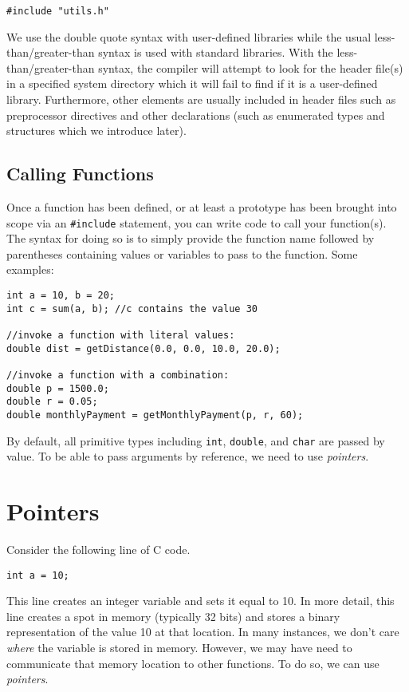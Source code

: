 \texttt{#include "utils.h"}

We use the double quote syntax with user-defined libraries while the
usual less-than/greater-than syntax is used with standard libraries.
With the less-than/greater-than syntax, the compiler will  
attempt to look for the header file(s) in a specified system directory
which it will fail to find if it is a user-defined library.
Furthermore, other elements are usually included in header files
such as preprocessor directives and other declarations (such as
enumerated types and structures which we introduce later).

\subsection{Calling Functions}

Once a function has been defined, or at least a prototype has
been brought into scope via an \texttt{#include} statement, 
you can write code to call your function(s).  The syntax for
doing so is to simply provide the function name followed by 
parentheses containing values or variables to pass to the function.
Some examples:

\begin{verbatim}
int a = 10, b = 20;
int c = sum(a, b); //c contains the value 30

//invoke a function with literal values:
double dist = getDistance(0.0, 0.0, 10.0, 20.0);

//invoke a function with a combination:
double p = 1500.0;
double r = 0.05;
double monthlyPayment = getMonthlyPayment(p, r, 60);
\end{verbatim}

By default, all primitive types including \texttt{int}, 
\texttt{double}, and \texttt{char} are passed by 
value.  To be able to pass arguments by reference, we need to use
\emph{pointers}.

\section{Pointers}
\label{section:cPointers}

Consider the following line of C code.

\texttt{int a = 10;}

This line creates an integer variable and sets it equal to 10.  In
more detail, this line creates a spot in memory (typically 32 bits)
and stores a binary representation of the value 10 at that location.
In many instances, we don't care \emph{where} the variable
is stored in memory.  However, we may have need to communicate
that memory location to other functions.  To do so, we can use 
\emph{pointers}.

